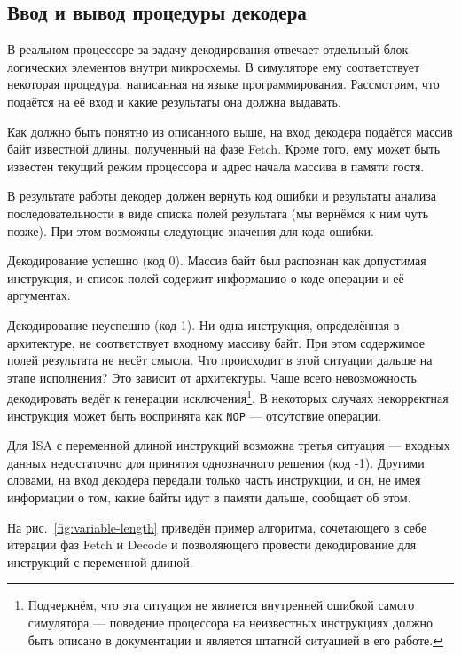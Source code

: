 \subsection{Ввод и вывод процедуры декодера}

В реальном процессоре за задачу декодирования отвечает отдельный блок логических элементов внутри микросхемы. В симуляторе ему соответствует некоторая процедура, написанная на языке программирования. Рассмотрим, что подаётся на её вход и какие результаты она должна выдавать.

Как должно быть понятно из описанного выше, на вход декодера подаётся массив байт известной длины, полученный на фазе Fetch. Кроме того, ему может быть известен текущий режим процессора и адрес начала массива в памяти гостя.

В результате работы декодер должен вернуть код ошибки и результаты анализа последовательности в виде списка полей результата (мы вернёмся к ним чуть позже). При этом возможны следующие значения для кода ошибки.

\begin{enumerate*}
    \item Декодирование успешно (код 0). Массив байт был распознан как допустимая инструкция, и список полей содержит информацию о коде операции и её аргументах.
    \item Декодирование неуспешно (код 1). Ни одна инструкция, определённая в архитектуре, не соответствует входному массиву байт. При этом содержимое полей результата не несёт смысла. Что происходит в этой ситуации дальше на этапе исполнения? Это зависит от архитектуры. Чаще всего невозможность декодировать ведёт к генерации исключения\footnote{Подчеркнём, что эта ситуация не является внутренней ошибкой самого симулятора --- поведение процессора на неизвестных инструкциях должно быть описано в документации и является штатной ситуацией в его работе.}. В некоторых случаях некорректная инструкция может быть воспринята как \texttt{NOP} --- отсутствие операции.
    \item Для ISA с переменной длиной инструкций возможна третья ситуация --- входных данных недостаточно для принятия однозначного решения (код -1). Другими словами, на вход декодера передали только часть инструкции, и он, не имея информации о том, какие байты идут в памяти дальше, сообщает об этом.
\end{enumerate*}

На рис.~\ref{fig:variable-length} приведён пример алгоритма, сочетающего в себе итерации фаз Fetch и Decode и позволяющего провести декодирование для инструкций с переменной длиной.

